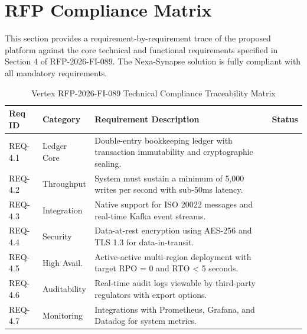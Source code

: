 \section{RFP Compliance Matrix}
\label{sec:compliance_matrix}

This section provides a requirement-by-requirement trace of the proposed platform against the core technical and functional requirements specified in Section 4 of RFP-2026-FI-089. The Nexa-Synapse solution is fully compliant with all mandatory requirements.

\begin{table}[htbp]
\centering
\small
\renewcommand{\arraystretch}{1.2}
\begin{tabularx}{\textwidth}{|P{1.8cm}|P{2.2cm}|L|c|}
\hline
{}
\textbf{\color{white}Req ID} & \textbf{\color{white}Category} & \textbf{\color{white}Requirement Description} & \textbf{\color{white}Status} \\ \hline
REQ-4.1 & Ledger Core & Double-entry bookkeeping ledger with transaction immutability and cryptographic sealing. &  \\ \hline
REQ-4.2 & Throughput & System must sustain a minimum of 5,000 writes per second with sub-50ms latency. &  \\ \hline
REQ-4.3 & Integration & Native support for ISO 20022 messages and real-time Kafka event streams. &  \\ \hline
REQ-4.4 & Security & Data-at-rest encryption using AES-256 and TLS 1.3 for data-in-transit. &  \\ \hline
REQ-4.5 & High Avail. & Active-active multi-region deployment with target RPO = 0 and RTO < 5 seconds. &  \\ \hline
REQ-4.6 & Auditability & Real-time audit logs viewable by third-party regulators with export options. &  \\ \hline
REQ-4.7 & Monitoring & Integrations with Prometheus, Grafana, and Datadog for system metrics. &  \\ \hline
\end{tabularx}
\caption{Vertex RFP-2026-FI-089 Technical Compliance Traceability Matrix}
\label{tab:compliance_matrix}
\end{table}

